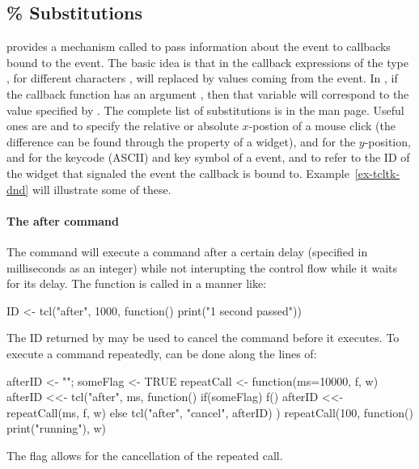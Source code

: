 \subsection{\% Substitutions}
\label{sec:tcltk-percent-substitutions}
\TK\/ provides a mechanism called  to pass
information about the event to callbacks bound to the event. The basic
idea is that in the \TCL\/ callback expressions of the type ,
for different characters , will replaced by values coming from
the event. In , if the callback function has an argument
, then that variable will correspond to the value specified by
. The complete list of substitutions is in the 
man page. Useful ones are  and  to specify the
relative or absolute $x$-postion of a mouse click (the difference can
be found through the  property of a widget),  and
 for the $y$-position,  and  for the keycode
(ASCII) and key symbol of a  event, and  to
refer to the ID of the widget that signaled the event the callback is
bound to. Example~\ref{ex-tcltk-dnd} will illustrate some of these.

\paragraph{The after command}
The \TCL\/ command  will execute a command after a certain delay (specified in milliseconds as an integer) while not interupting the control flow while it waits for its delay. The function is called in a manner like:
\begin{Schunk}
  \begin{Sinput}
    ID <- tcl("after", 1000, function() print("1 second passed"))    
  \end{Sinput}
\end{Schunk}
The ID returned by  may be used to cancel the command
before it executes. To execute a command repeatedly, can be done along
the lines of:
\begin{Schunk}
\begin{Sinput}
 afterID <- ""; someFlag <- TRUE
 repeatCall <- function(ms=10000, f, w) {
   afterID <<- tcl("after", ms, function() {
     if(someFlag) {                      
       f()
       afterID <<- repeatCall(ms, f, w)
     }  else {
       tcl("after", "cancel", afterID)
     }
   })
 }
 repeatCall(100, function() print("running"), w)
\end{Sinput}
\end{Schunk}
The flag allows for the cancellation of the repeated call.


